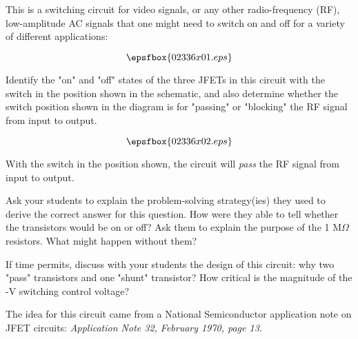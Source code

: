 

This is a switching circuit for video signals, or any other radio-frequency (RF), low-amplitude AC signals that one might need to switch on and off for a variety of different applications:

$$\epsfbox{02336x01.eps}$$

Identify the "on" and "off" states of the three JFETs in this circuit with the switch in the position shown in the schematic, and also determine whether the switch position shown in the diagram is for "passing" or "blocking" the RF signal from input to output.







$$\epsfbox{02336x02.eps}$$

With the switch in the position shown, the circuit will {\it pass} the RF signal from input to output.







Ask your students to explain the problem-solving strategy(ies) they used to derive the correct answer for this question.  How were they able to tell whether the transistors would be on or off?  Ask them to explain the purpose of the 1 M$\Omega$ resistors.  What might happen without them?

If time permits, discuss with your students the design of this circuit: why two "pass" transistors and one "shunt" transistor?  How critical is the magnitude of the -V switching control voltage?

The idea for this circuit came from a National Semiconductor application note on JFET circuits: {\it Application Note 32, February 1970, page 13}.




